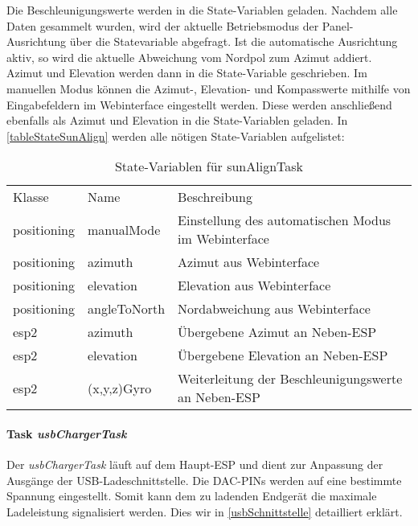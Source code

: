 Die Beschleunigungswerte werden in die State-Variablen geladen.
Nachdem alle Daten gesammelt wurden, wird der aktuelle Betriebsmodus der Panel-Ausrichtung über die Statevariable abgefragt.
Ist die automatische Ausrichtung aktiv, so wird die aktuelle Abweichung vom Nordpol zum Azimut addiert.
Azimut und Elevation  werden dann in die State-Variable geschrieben.
Im manuellen Modus können die Azimut-, Elevation- und Kompasswerte mithilfe von Eingabefeldern im Webinterface eingestellt werden.
Diese werden anschließend ebenfalls als Azimut und Elevation in die State-Variablen geladen. In \autoref{tableStateSunAlign} werden alle nötigen State-Variablen aufgelistet:

\begin{table}[H]
    \begin{center}
        \begin{tabular}{|l|l|l|}
            \hline
            Klasse & Name                  & Beschreibung                                        \\
            \Xhline{3\arrayrulewidth}
            positioning & manualMode & Einstellung des automatischen Modus im Webinterface       \\
            \hline
            positioning & azimuth           & Azimut aus Webinterface                            \\
            \hline
            positioning & elevation         & Elevation aus Webinterface                         \\
            \hline
            positioning & angleToNorth      & Nordabweichung aus Webinterface                    \\
            \hline
            esp2 & azimuth        & Übergebene Azimut an Neben-ESP                               \\
            \hline
            esp2 & elevation      & Übergebene Elevation an Neben-ESP                            \\
            \hline
            esp2 & (x,y,z)Gyro           & Weiterleitung der Beschleunigungswerte an Neben-ESP   \\
            \hline
        \end{tabular}
        \caption{State-Variablen für sunAlignTask}
        \label{tableStateSunAlign}
    \end{center}
\end{table}


\paragraph{Task \textit{usbChargerTask}}
Der \textit{usbChargerTask} läuft auf dem Haupt-ESP und dient zur Anpassung der Ausgänge der USB-Ladeschnittstelle.
Die DAC-PINs werden auf eine bestimmte Spannung eingestellt.
Somit kann dem zu ladenden Endgerät die maximale Ladeleistung signalisiert werden.
Dies wir in \autoref{usbSchnittstelle} detailliert erklärt.


